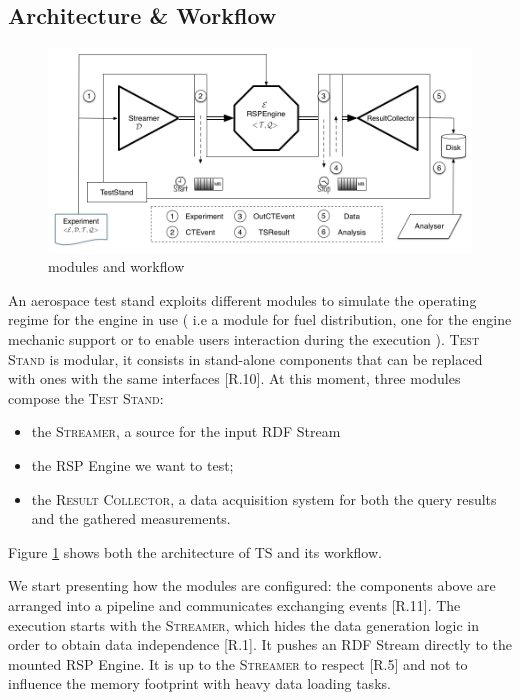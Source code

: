 \subsection{Architecture \& Workflow}\label{sec:arch-workflow}

\begin{figure}[tbh]
\centering
\includegraphics[scale=0.37]{images/schema2}
\caption{\name modules and workflow} 
\label{fig:architecture}
\end{figure}

\noindent An aerospace test stand exploits different modules to simulate the operating regime for the engine in use ( i.e a module for fuel distribution, one for the engine mechanic support or to enable users interaction during the execution ). \name \textsc{Test Stand}  is modular, it consists in stand-alone components that can be replaced with ones with the same interfaces [R.10]. At this moment, three modules compose the \textsc{Test Stand}:
\begin{itemize}
\item the \textsc{Streamer}, a source for the input RDF Stream
\item the RSP Engine we want to test;
\item the \textsc{Result Collector}, a data acquisition system for both the query results and the gathered measurements.
\end{itemize}
Figure \ref{fig:architecture} shows both the architecture of \name TS and its workflow.

We start presenting how the modules are configured: the components above are arranged into a pipeline and communicates exchanging events [R.11].  The execution starts with the \textsc{Streamer}, which hides the data generation logic in order to obtain data independence [R.1]. It pushes an RDF Stream directly to the mounted RSP Engine. It is up to the \textsc{Streamer} to respect [R.5] and not to influence the memory footprint with heavy data loading tasks. 

